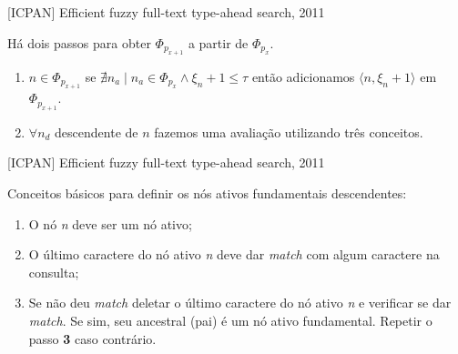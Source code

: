 \documentclass[11pt]{beamer}
\begin{document}
\begin{frame}{[ICPAN] Efficient fuzzy full-text type-ahead search, 2011}

    \large
    Há dois passos para obter $\Phi_{p_{x+1}}$ a partir de $\Phi_{p_{x}}$.

    \begin{enumerate}
        \item $n \in \Phi_{p_{x+1}}$ se $\nexists n_a \mid n_a \in \Phi_{p_{x}} \land \xi_{n} + 1 \le \tau$ então adicionamos $\big \langle n, \xi_{n} + 1 \big \rangle$ em $\Phi_{p_{x+1}}$.
        \item $\forall n_d$ descendente de $n$ fazemos uma avaliação utilizando três conceitos. 
    \end{enumerate}
    
\end{frame}

\begin{frame}{[ICPAN] Efficient fuzzy full-text type-ahead search, 2011}
    
    \large
    Conceitos básicos para definir os nós ativos fundamentais descendentes:
    
    \begin{enumerate}
        \item O nó \textit{n} deve ser um nó ativo; \pause
        \item O último caractere do nó ativo \textit{n} deve dar \textit{match} com algum caractere na consulta; \pause
        \item Se não deu \textit{match} deletar o último caractere do nó ativo \textit{n} e verificar se dar \textit{match}. Se sim, seu ancestral (pai) é um nó ativo fundamental. Repetir o passo \textbf{3} caso contrário.
    \end{enumerate}
    
\end{frame}
\end{document}
